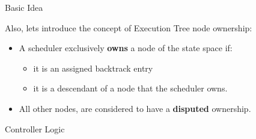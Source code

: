 \documentclass[9pt]{beamer}
\begin{document}
\begin{frame} {Basic Idea}

Also, lets introduce the concept of Execution Tree node ownership:

\begin{itemize}[<+->]
  \item A scheduler exclusively \textbf{owns} a node of the state space if: 
    \begin{itemize}
    \item it is an assigned backtrack entry
    \item it is a descendant of a node that the scheduler owns.
    \end{itemize}
  \item All other nodes, are considered to have a \textbf{disputed} ownership.
\end{itemize}

\end{frame}

\begin{frame} {Controller Logic}

\begin{algorithm}[H]
    \label{controllerloop}

\end{algorithm}

\end{frame}
\end{document}
